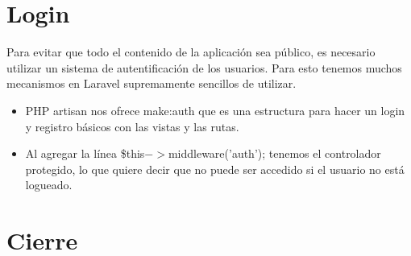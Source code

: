 \documentclass{article}
\begin{document}
\section{Login}%
Para evitar que todo el contenido de la aplicación sea público, es necesario
utilizar un sistema de autentificación de los usuarios. Para esto tenemos
muchos mecanismos en Laravel supremamente sencillos de utilizar.\\

\begin{itemize}
  \item PHP artisan nos ofrece make:auth que es una estructura para hacer un
    login y registro básicos con las vistas y las rutas.
  \item Al agregar la línea \$this$->$middleware('auth'); tenemos el controlador
    protegido, lo que quiere decir que no puede ser accedido si el usuario no
    está logueado.
\end{itemize}

\section{Cierre}%
\end{document}
